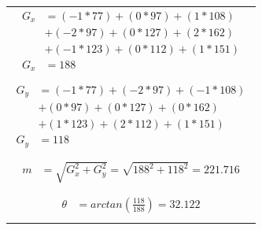 \begin{table}[H]
	\begin{adjustbox}{width=1\textwidth}
		\begin{tabular}{|p{15cm}|}
			\hline
			\begin{equation}\nonumber
			\begin{aligned}
			G_{x} &= (-1 * 77) + (0 * 97) + (1 * 108) \\
			 	  &+ (-2 * 97) + (0 * 127) + (2 * 162) \\ 
			 	  &+ (-1 * 123) + (0 * 112) + (1 * 151)\\
			G_{x} &= 188\\
			\end{aligned}
			\end{equation}\\
			\begin{equation}\nonumber
			\begin{aligned}
			G_{y} &= (-1 * 77) + (-2 * 97) + (-1 * 108) \\
				  &+ (0 * 97) + (0 * 127) + (0 * 162) \\
				  &+ (1 * 123) + (2 * 112) + (1 * 151) \\
			G_{y} &= 118\\
			\end{aligned}
			\end{equation}\\
			\begin{equation}\nonumber
			\begin{aligned}
			m &= \sqrt{G_{x}^2 + G_{y}^2} = \sqrt{188^2 + 118^2} = 221.716 \\
			\end{aligned}
			\end{equation}\\
			\begin{equation}\nonumber
			\begin{aligned}
			\theta &= arctan(\frac{118}{188}) = 32.122 \\
			\end{aligned}
			\end{equation}\\
			\hline
		\end{tabular}
	\end{adjustbox}
	\label{fig:PerhitunganGradiendanArah}
\end{table}

